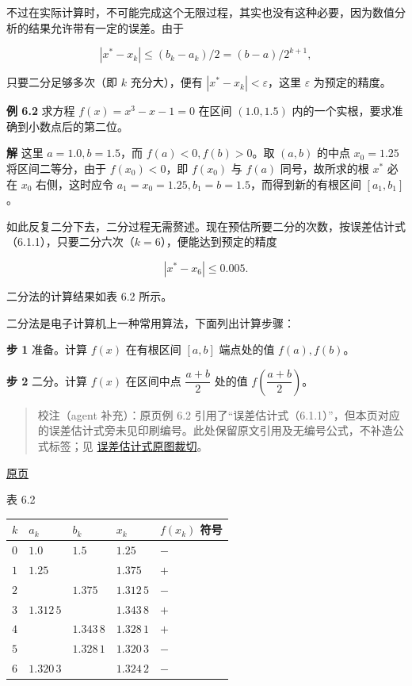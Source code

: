 \documentclass[
  10pt,
  fontset=fandol]{ctexart}
\newcounter{none} %
\begin{document}
不过在实际计算时，不可能完成这个无限过程，其实也没有这种必要，因为数值分析的结果允许带有一定的误差。由于

\[
|x^*-x_k|\leqslant(b_k-a_k)/2=(b-a)/2^{k+1},
\]

只要二分足够多次（即 \(k\) 充分大），便有 \(|x^*-x_k|<\varepsilon\)，这里 \(\varepsilon\) 为预定的精度。

\textbf{例 6.2} 求方程 \(f(x)=x^3-x-1=0\) 在区间 \((1.0,1.5)\) 内的一个实根，要求准确到小数点后的第二位。

\textbf{解} 这里 \(a=1.0,b=1.5\)，而 \(f(a)<0,f(b)>0\)。取 \((a,b)\) 的中点 \(x_0=1.25\) 将区间二等分，由于 \(f(x_0)<0\)，即 \(f(x_0)\) 与 \(f(a)\) 同号，故所求的根 \(x^*\) 必在 \(x_0\) 右侧，这时应令 \(a_1=x_0=1.25,b_1=b=1.5\)，而得到新的有根区间 \([a_1,b_1]\)。

如此反复二分下去，二分过程无需赘述。现在预估所要二分的次数，按误差估计式（6.1.1），只要二分六次（\(k=6\)），便能达到预定的精度

\[
|x^*-x_6|\leqslant0.005.
\]

二分法的计算结果如表 6.2 所示。

二分法是电子计算机上一种常用算法，下面列出计算步骤：

\textbf{步 1} 准备。计算 \(f(x)\) 在有根区间 \([a,b]\) 端点处的值 \(f(a),f(b)\)。

\textbf{步 2} 二分。计算 \(f(x)\) 在区间中点 \(\dfrac{a+b}{2}\) 处的值 \(f\left(\dfrac{a+b}{2}\right)\)。

\begin{quote}
校注（agent 补充）：原页例 6.2 引用了``误差估计式（6.1.1）''，但本页对应的误差估计式旁未见印刷编号。此处保留原文引用及无编号公式，不补造公式标签；见 \href{../assets/ch06/detail-p156-audit.png}{误差估计式原图裁切}。
\end{quote}

\href{../../source-images/pdf-157.jpeg}{原页}

表 6.2

{\def\LTcaptype{none} %
\begin{longtable}[]{@{}lllll@{}}
\toprule\noalign{}
\(k\) & \(a_k\) & \(b_k\) & \(x_k\) & \(f(x_k)\) 符号 \\
\midrule\noalign{}
\endhead
\bottomrule\noalign{}
\endlastfoot
\(0\) & \(1.0\) & \(1.5\) & \(1.25\) & \(-\) \\
\(1\) & \(1.25\) & & \(1.375\) & \(+\) \\
\(2\) & & \(1.375\) & \(1.312\,5\) & \(-\) \\
\(3\) & \(1.312\,5\) & & \(1.343\,8\) & \(+\) \\
\(4\) & & \(1.343\,8\) & \(1.328\,1\) & \(+\) \\
\(5\) & & \(1.328\,1\) & \(1.320\,3\) & \(-\) \\
\(6\) & \(1.320\,3\) & & \(1.324\,2\) & \(-\) \\
\end{longtable}
}
\end{document}
